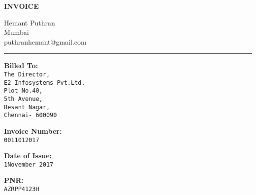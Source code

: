 \documentclass[]{invoice-style}
\begin{document}
\begin{minipage}[t][60em][c]{\textwidth}
\begin{minipage}[][12em][c]{\textwidth}
\begin{minipage}[][9em][c]{0.3\textwidth}
        {\Huge \textbf{INVOICE} }
\end{minipage}
\hfill
\begin{minipage}[][9em][c]{0.4\textwidth}
\begin{flushright}
        {\large Hemant Puthran\\ Mumbai\\ puthranhemant@gmail.com\\}
        \end{flushright}
\end{minipage}
\end{minipage}
\hrule
\begin{minipage}[][17em][c]{\textwidth} 
	\begin{minipage}[c][13em][t]{.42\textwidth} 
	    {\bfseries \Large Billed To:}\vspace{.25cm}\\{\Large {\tt The Director,\\E2 Infosystems Pvt.Ltd.\\
	    Plot No.40,\\ 5th Avenue,\\Besant Nagar,\\Chennai- 600090}}
	\end{minipage}%
	\hfill
\begin{minipage}[][13em][t]{.28\textwidth}   
\begin{minipage}[][][c]{.9\textwidth}{\bfseries \Large Invoice Number:}\vspace{.25cm}\\{\Large {\tt 0011012017}}
\end{minipage}
\vfill
\begin{minipage}[][][c]{.9\textwidth}{\bfseries \Large Date of Issue:}\vspace{.25cm}\\{\Large {\tt 1November 2017}}
\end{minipage}
\vfill
\begin{minipage}[][][c]{.9\textwidth}{\bfseries \Large PNR:}\vspace{.25cm}\\{\Large {\tt AZRPP4123H}}
\end{minipage}
\end{minipage}

\end{minipage}
\end{minipage}
\end{document}

